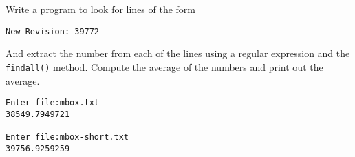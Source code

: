 \begin{ex}
Write a program to look for lines of the form

\verb"New Revision: 39772"

And extract the number from each of the lines using a regular expression
and the {\tt findall()} method.  Compute the average of the numbers and 
print out the average.

\beforeverb
\begin{verbatim}
Enter file:mbox.txt 
38549.7949721

Enter file:mbox-short.txt
39756.9259259
\end{verbatim}
\afterverb
%

\end{ex}


